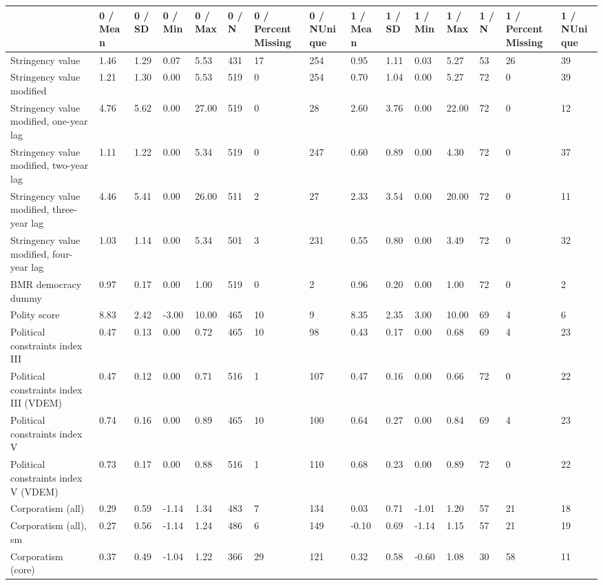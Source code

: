 
\begin{longtable}{lllllllllllllll}
\toprule
  & 0 / Mean & 0 / SD & 0 / Min & 0 / Max & 0 / N & 0 / PercentMissing & 0 / NUnique & 1 / Mean & 1 / SD & 1 / Min & 1 / Max & 1 / N & 1 / PercentMissing & 1 / NUnique\\
\midrule
Stringency value & 1.46 & 1.29 & 0.07 & 5.53 & 431 & 17 & 254 & 0.95 & 1.11 & 0.03 & 5.27 & 53 & 26 & 39\\
Stringency value modified & 1.21 & 1.30 & 0.00 & 5.53 & 519 & 0 & 254 & 0.70 & 1.04 & 0.00 & 5.27 & 72 & 0 & 39\\
Stringency value modified, one-year lag & 4.76 & 5.62 & 0.00 & 27.00 & 519 & 0 & 28 & 2.60 & 3.76 & 0.00 & 22.00 & 72 & 0 & 12\\
Stringency value modified, two-year lag & 1.11 & 1.22 & 0.00 & 5.34 & 519 & 0 & 247 & 0.60 & 0.89 & 0.00 & 4.30 & 72 & 0 & 37\\
Stringency value modified, three-year lag & 4.46 & 5.41 & 0.00 & 26.00 & 511 & 2 & 27 & 2.33 & 3.54 & 0.00 & 20.00 & 72 & 0 & 11\\
\addlinespace
Stringency value modified, four-year lag & 1.03 & 1.14 & 0.00 & 5.34 & 501 & 3 & 231 & 0.55 & 0.80 & 0.00 & 3.49 & 72 & 0 & 32\\
BMR democracy dummy & 0.97 & 0.17 & 0.00 & 1.00 & 519 & 0 & 2 & 0.96 & 0.20 & 0.00 & 1.00 & 72 & 0 & 2\\
Polity score & 8.83 & 2.42 & -3.00 & 10.00 & 465 & 10 & 9 & 8.35 & 2.35 & 3.00 & 10.00 & 69 & 4 & 6\\
Political constraints index III & 0.47 & 0.13 & 0.00 & 0.72 & 465 & 10 & 98 & 0.43 & 0.17 & 0.00 & 0.68 & 69 & 4 & 23\\
Political constraints index III (VDEM) & 0.47 & 0.12 & 0.00 & 0.71 & 516 & 1 & 107 & 0.47 & 0.16 & 0.00 & 0.66 & 72 & 0 & 22\\
\addlinespace
Political constraints index V & 0.74 & 0.16 & 0.00 & 0.89 & 465 & 10 & 100 & 0.64 & 0.27 & 0.00 & 0.84 & 69 & 4 & 23\\
Political constraints index V (VDEM) & 0.73 & 0.17 & 0.00 & 0.88 & 516 & 1 & 110 & 0.68 & 0.23 & 0.00 & 0.89 & 72 & 0 & 22\\
Corporatism (all) & 0.29 & 0.59 & -1.14 & 1.34 & 483 & 7 & 134 & 0.03 & 0.71 & -1.01 & 1.20 & 57 & 21 & 18\\
Corporatism (all), sm & 0.27 & 0.56 & -1.14 & 1.24 & 486 & 6 & 149 & -0.10 & 0.69 & -1.14 & 1.15 & 57 & 21 & 19\\
Corporatism (core) & 0.37 & 0.49 & -1.04 & 1.22 & 366 & 29 & 121 & 0.32 & 0.58 & -0.60 & 1.08 & 30 & 58 & 11\\

\end{longtable}
